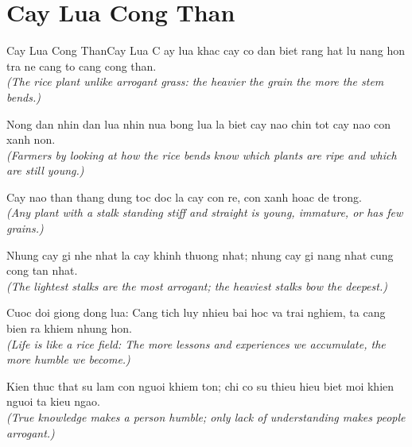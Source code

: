 \section{Cay Lua Cong Than}
\begin{truyen}{Cay Lua Cong Than}{Cay Lua}
C ay lua khac cay co dan biet rang hat lu nang hon tra ne cang to cang cong than.\\
\textit{(The rice plant unlike arrogant grass: the heavier the grain the more the stem bends.)}

Nong dan nhin dan lua nhin nua bong lua la biet cay nao chin tot cay nao con xanh non.\\
\textit{(Farmers by looking at how the rice bends know which plants are ripe and which are still young.)}

Cay nao than thang dung toc doc la cay con re, con xanh hoac de trong.\\
\textit{(Any plant with a stalk standing stiff and straight is young, immature, or has few grains.)}

Nhung cay gi nhe nhat la cay khinh thuong nhat; nhung cay gi nang nhat cung cong tan nhat.\\
\textit{(The lightest stalks are the most arrogant; the heaviest stalks bow the deepest.)}

Cuoc doi giong dong lua: Cang tich luy nhieu bai hoc va trai nghiem, ta cang bien ra khiem nhung hon.\\
\textit{(Life is like a rice field: The more lessons and experiences we accumulate, the more humble we become.)}

\end{truyen}
\begin{baihoc}
  Kien thuc that su lam con nguoi khiem ton; chi co su thieu hieu biet moi khien nguoi ta kieu ngao.\\
  \textit{(True knowledge makes a person humble; only lack of understanding makes people arrogant.)}
\end{baihoc}

